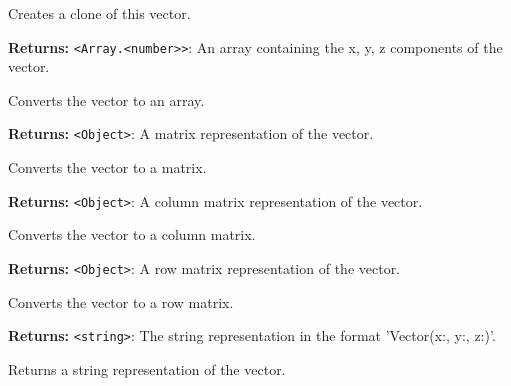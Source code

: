 \documentclass[12pt,a4paper]{article}
\begin{document}
\noindent Creates a clone of this vector.

\vspace{5mm}
\noindent {}


\noindent \textbf{Returns:} \texttt{<Array.<number>>}: An array containing the x, y, z components of the vector.

\noindent Converts the vector to an array.

\vspace{5mm}
\noindent {}


\noindent \textbf{Returns:} \texttt{<Object>}: A matrix representation of the vector.

\noindent Converts the vector to a matrix.

\vspace{5mm}
\noindent {}


\noindent \textbf{Returns:} \texttt{<Object>}: A column matrix representation of the vector.

\noindent Converts the vector to a column matrix.

\vspace{5mm}
\noindent {}


\noindent \textbf{Returns:} \texttt{<Object>}: A row matrix representation of the vector.

\noindent Converts the vector to a row matrix.

\vspace{5mm}
\noindent {}


\noindent \textbf{Returns:} \texttt{<string>}: The string representation in the format 'Vector(x:, y:, z:)'.

\noindent Returns a string representation of the vector.

\vspace{5mm}
\noindent {}
\end{document}
